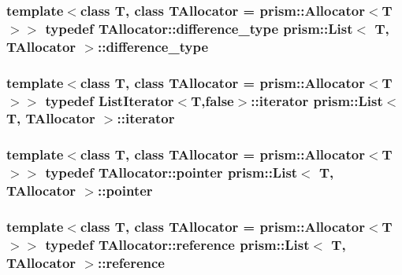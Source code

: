 \subsubsection[{\texorpdfstring{difference\+\_\+type}{difference_type}}]{\setlength{\rightskip}{0pt plus 5cm}template$<$class T, class T\+Allocator = prism\+::\+Allocator$<$\+T$>$$>$ typedef T\+Allocator\+::difference\+\_\+type {\bf prism\+::\+List}$<$ T, T\+Allocator $>$\+::{\bf difference\+\_\+type}}\hypertarget{classprism_1_1_list_a02ec6617f6c1782af39c85431c6803ab}{}\label{classprism_1_1_list_a02ec6617f6c1782af39c85431c6803ab}
\subsubsection[{\texorpdfstring{iterator}{iterator}}]{\setlength{\rightskip}{0pt plus 5cm}template$<$class T, class T\+Allocator = prism\+::\+Allocator$<$\+T$>$$>$ typedef {\bf List\+Iterator}$<$T,false$>$\+::{\bf iterator} {\bf prism\+::\+List}$<$ T, T\+Allocator $>$\+::{\bf iterator}}\hypertarget{classprism_1_1_list_aa95cb21a8754f91406f53bd0315513af}{}\label{classprism_1_1_list_aa95cb21a8754f91406f53bd0315513af}
\subsubsection[{\texorpdfstring{pointer}{pointer}}]{\setlength{\rightskip}{0pt plus 5cm}template$<$class T, class T\+Allocator = prism\+::\+Allocator$<$\+T$>$$>$ typedef T\+Allocator\+::pointer {\bf prism\+::\+List}$<$ T, T\+Allocator $>$\+::{\bf pointer}}\hypertarget{classprism_1_1_list_ac9c2d25c50b4ebfb02687eeb4e9668bc}{}\label{classprism_1_1_list_ac9c2d25c50b4ebfb02687eeb4e9668bc}
\subsubsection[{\texorpdfstring{reference}{reference}}]{\setlength{\rightskip}{0pt plus 5cm}template$<$class T, class T\+Allocator = prism\+::\+Allocator$<$\+T$>$$>$ typedef T\+Allocator\+::reference {\bf prism\+::\+List}$<$ T, T\+Allocator $>$\+::{\bf reference}}\hypertarget{classprism_1_1_list_a87113fe9cf2580e395e3d9f2962f4e81}{}\label{classprism_1_1_list_a87113fe9cf2580e395e3d9f2962f4e81}
